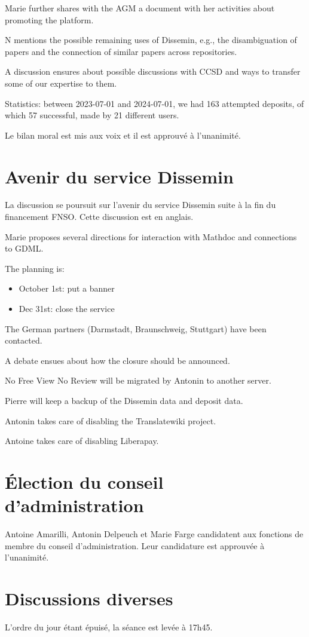 \documentclass[a4paper]{article}
\begin{document}
Marie further shares with the AGM a document with her activities about promoting the platform.

N mentions the possible remaining uses of Dissemin, e.g., the disambiguation of papers and the connection of similar papers across repositories.

A discussion ensures about possible discussions with CCSD and ways to transfer some of our expertise to them.

Statistics: between 2023-07-01 and 2024-07-01, we had 163 attempted deposits, of which 57 successful, made by 21 different users.

Le bilan moral est mis aux voix et il est approuvé à l'unanimité.

\section{Avenir du service Dissemin}

La discussion se poursuit sur l'avenir du service Dissemin suite à la fin du
financement FNSO. Cette discussion est en anglais.

Marie proposes several directions for interaction with Mathdoc and connections to GDML.

The planning is:

\begin{itemize}
  \item October 1st: put a banner
  \item Dec 31st: close the service
\end{itemize}

The German partners (Darmstadt, Braunschweig, Stuttgart) have been contacted.

A debate ensues about how the closure should be announced.

No Free View No Review will be migrated by Antonin to another server.

Pierre will keep a backup of the Dissemin data and deposit data.

Antonin takes care of disabling the Translatewiki project.

Antoine takes care of disabling Liberapay.

\section{Élection du conseil d'administration}

Antoine Amarilli, Antonin Delpeuch et Marie Farge candidatent aux fonctions de
membre du conseil d'administration. Leur candidature est approuvée à
l'unanimité.

\section{Discussions diverses}

L'ordre du jour étant épuisé, la séance est levée à 17h45.
\end{document}

